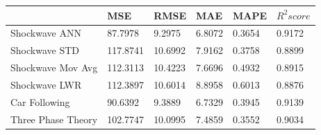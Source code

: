 \documentclass[11pt]{report}
\begin{document}
\begin{table}[H]
	\begin{center}
	\vspace{0.5cm}
	\begin{tabular}{@{}llllll@{}}
		\toprule
										   & MSE                                                  & RMSE                                                & MAE                                                 & MAPE                                                & $R^2score$                                          \\ \midrule
		\multicolumn{1}{l|}{Shockwave ANN} & \multicolumn{1}{l|}{\cellcolor[HTML]{C0C0C0}87.7978} & \multicolumn{1}{l|}{\cellcolor[HTML]{C0C0C0}9.2975} & 6.8072                                              & \multicolumn{1}{l|}{0.3654}                         & \multicolumn{1}{l|}{\cellcolor[HTML]{C0C0C0}0.9172} \\
		Shockwave STD                      & 117.8741                                             & 10.6992                                             & 7.9162                                              & 0.3758                                              & 0.8899                                              \\
		Shockwave Mov Avg                  & 112.3113                                             & 10.4223                                             & 7.6696                                              & 0.4932                                              & 0.8915                                              \\
		Shockwave LWR                      & 112.3897                                             & 10.6014                                             & 8.8958                                              & 0.6013                                              & 0.8876                                              \\
		Car Following                      & 90.6392                                              & 9.3889                                              & 6.7329                                              & 0.3945                                              & 0.9139                                              \\
		Three Phase Theory                 & 102.7747                                             & 10.0995                                             & \multicolumn{1}{l|}{7.4859}                         & \multicolumn{1}{l|}{\cellcolor[HTML]{C0C0C0}0.3552} & 0.9034                                              \\

\end{tabular}
\end{center}
\end{table}
\end{document}
